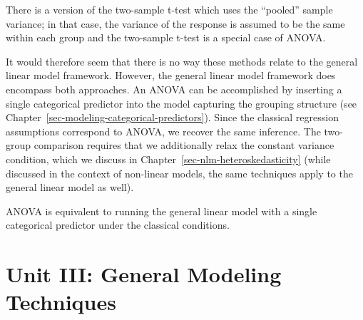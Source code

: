 \documentclass[
  letterpaper,
  DIV=11,
  numbers=noendperiod]{scrreprt}
\theoremstyle{definition}
\theoremstyle{definition}
\theoremstyle{remark}
\begin{document}
\begin{tcolorbox}[enhanced jigsaw, left=2mm, toprule=.15mm, arc=.35mm, breakable, opacitybacktitle=0.6, opacityback=0, rightrule=.15mm, colbacktitle=quarto-callout-note-color!10!white, coltitle=black, leftrule=.75mm, toptitle=1mm, colframe=quarto-callout-note-color-frame, titlerule=0mm, title=\textcolor{quarto-callout-note-color}{\faInfo}\hspace{0.5em}{Note}, bottomrule=.15mm, colback=white, bottomtitle=1mm]

There is a version of the two-sample t-test which uses the ``pooled''
sample variance; in that case, the variance of the response is assumed
to be the same within each group and the two-sample t-test is a special
case of ANOVA.

\end{tcolorbox}

It would therefore seem that there is no way these methods relate to the
general linear model framework. However, the general linear model
framework does encompass both approaches. An ANOVA can be accomplished
by inserting a single categorical predictor into the model capturing the
grouping structure (see
Chapter~\ref{sec-modeling-categorical-predictors}). Since the classical
regression assumptions correspond to ANOVA, we recover the same
inference. The two-group comparison requires that we additionally relax
the constant variance condition, which we discuss in
Chapter~\ref{sec-nlm-heteroskedasticity} (while discussed in the context
of non-linear models, the same techniques apply to the general linear
model as well).

\begin{tcolorbox}[enhanced jigsaw, left=2mm, toprule=.15mm, arc=.35mm, breakable, opacitybacktitle=0.6, opacityback=0, rightrule=.15mm, colbacktitle=quarto-callout-tip-color!10!white, coltitle=black, leftrule=.75mm, toptitle=1mm, colframe=quarto-callout-tip-color-frame, titlerule=0mm, title=\textcolor{quarto-callout-tip-color}{\faLightbulb}\hspace{0.5em}{Big Idea}, bottomrule=.15mm, colback=white, bottomtitle=1mm]

ANOVA is equivalent to running the general linear model with a single
categorical predictor under the classical conditions.

\end{tcolorbox}

\part{Unit III: General Modeling Techniques}
\end{document}
